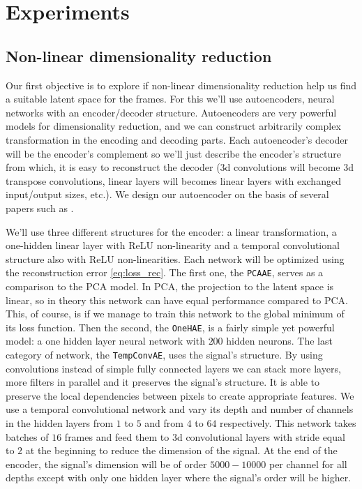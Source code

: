 \documentclass[twocolumn,10pt]{asme2ej}
\begin{document}
\section{Experiments}

\subsection{Non-linear dimensionality reduction}

Our first objective is to explore if non-linear dimensionality reduction help us find a suitable latent space for the frames. For this we'll use autoencoders, neural networks with an encoder/decoder structure. Autoencoders are very powerful models for dimensionality reduction, and we can construct arbitrarily complex transformation in the encoding and decoding parts. Each autoencoder's decoder will be the encoder's complement so we'll just describe the encoder's structure from which, it is easy to reconstruct the decoder ($3$d convolutions will become $3$d transpose convolutions, linear layers will becomes linear layers with exchanged input/output sizes, etc.). We design our autoencoder on the basis of several papers such as \cite{temp-regularity-AE, endtoend-AE}.

We'll use three different structures for the encoder: a linear transformation, a one-hidden linear layer with ReLU non-linearity and a temporal convolutional structure also with ReLU non-linearities. Each network will be optimized using the reconstruction error \eqref{eq:loss_rec}. The first one, the \texttt{PCAAE}, serves as a comparison to the PCA model. In PCA, the projection to the latent space is linear, so in theory this network can have equal performance compared to PCA. This, of course, is if we manage to train this network to the global minimum of its loss function. Then the second, the \texttt{OneHAE}, is a fairly simple yet powerful model: a one hidden layer neural network with $200$ hidden neurons. The last category of network, the \texttt{TempConvAE}, uses the signal's structure. By using convolutions instead of simple fully connected layers we can stack more layers, more filters in parallel and it preserves the signal's structure. It is able to preserve the local dependencies between pixels to create appropriate features. We use a temporal convolutional network and vary its depth and number of channels in the hidden layers from $1$ to $5$ and from $4$ to $64$ respectively. This network takes batches of $16$ frames and feed them to $3$d convolutional layers with stride equal to $2$ at the beginning to reduce the dimension of the signal. At the end of the encoder, the signal's dimension will be of order $5000-10000$ per channel for all depths except with only one hidden layer where the signal's order will be higher.
\end{document}
